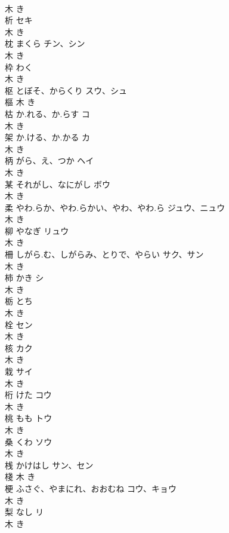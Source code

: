 \documentclass[8pt]{extreport}
\begin{document}
\begin{CJK}{UTF8}{min}
\\	木		き		
\\	析		セキ	
\\	木		き		
\\	枕	まくら	チン、シン	
\\	木		き		
\\	枠	わく		
\\	木		き		
\\	枢	とぼそ、からくり	スウ、シュ	
\\	樞	木		き		
\\	枯	か.れる、か.らす	コ	
\\	木		き		
\\	架	か.ける、か.かる	カ	
\\	木		き		
\\	柄	がら、え、つか	ヘイ	
\\	木		き		
\\	某	それがし、なにがし	ボウ	
\\	木		き		
\\	柔	やわ.らか、やわ.らかい、やわ、やわ.ら	ジュウ、ニュウ	
\\	木		き		
\\	柳	やなぎ	リュウ	
\\	木		き		
\\	柵	しがら.む、しがらみ、とりで、やらい	サク、サン	
\\	木		き		
\\	柿	かき	シ	
\\	木		き		
\\	栃	とち		
\\	木		き		
\\	栓		セン	
\\	木		き		
\\	核		カク	
\\	木		き		
\\	栽		サイ	
\\	木		き		
\\	桁	けた	コウ	
\\	木		き		
\\	桃	もも	トウ	
\\	木		き		
\\	桑	くわ	ソウ	
\\	木		き		
\\	桟	かけはし	サン、セン	
\\	棧	木		き		
\\	梗	ふさぐ、やまにれ、おおむね	コウ、キョウ	
\\	木		き		
\\	梨	なし	リ	
\\	木		き		

\end{CJK}
\end{document}
